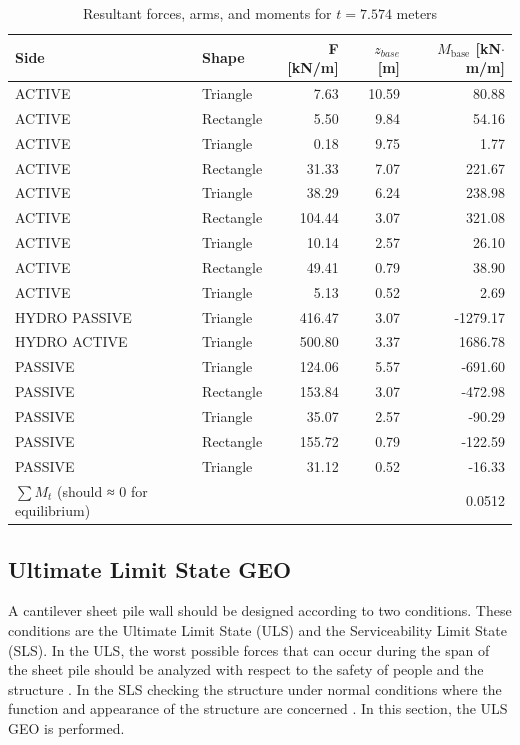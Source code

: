 \begin{table}[H]
  \centering
  \caption{Resultant forces, arms, and moments for $t = 7.574$ meters}
  \label{tab:forces_arms_moments_9713}
  \small
  \setlength{\tabcolsep}{8pt}
  \renewcommand{\arraystretch}{1.15}
  \begin{tabular}{@{}l l r r r@{}}
    \toprule
    Side & Shape &
    F [kN/m] & $z_{base}$ [m] &
    $M_{\text{base}}$ [kN$\cdot$m/m] \\
    \midrule
    ACTIVE  & Triangle  &   7.63  & 10.59 &  80.88 \\
    ACTIVE  & Rectangle &   5.50  &  9.84 &  54.16 \\
    ACTIVE  & Triangle  &   0.18  &  9.75 &   1.77 \\
    ACTIVE  & Rectangle &  31.33  &  7.07 & 221.67 \\
    ACTIVE  & Triangle  &  38.29  &  6.24 & 238.98 \\
    ACTIVE  & Rectangle & 104.44  &  3.07 & 321.08 \\
    ACTIVE  & Triangle  &  10.14  &  2.57 &  26.10 \\
    ACTIVE  & Rectangle &  49.41  &  0.79 &  38.90 \\
    ACTIVE  & Triangle  &   5.13  &  0.52 &   2.69 \\
    HYDRO PASSIVE   & Triangle  & 416.47  &  3.07 & -1279.17 \\
    HYDRO ACTIVE    & Triangle  & 500.80  &  3.37 & 1686.78 \\
    PASSIVE & Triangle  & 124.06  &  5.57 &  -691.60 \\
    PASSIVE & Rectangle & 153.84  &  3.07 &  -472.98 \\
    PASSIVE & Triangle  &  35.07  &  2.57 &   -90.29 \\
    PASSIVE & Rectangle & 155.72  &  0.79 &  -122.59 \\
    PASSIVE & Triangle  &  31.12  &  0.52 &   -16.33 \\
    \midrule
    $\sum M_{t}$ (should ≈ 0 for equilibrium) & & & & 0.0512 \\
    \bottomrule
  \end{tabular}
\end{table}

\subsection{Ultimate Limit State GEO}

A cantilever sheet pile wall should be designed according to two conditions. These conditions are the Ultimate Limit State (ULS) and the Serviceability Limit State (SLS). In the ULS, the worst possible forces that can occur during the span of the sheet pile should be analyzed with respect to the safety of people and the structure \autocite{baxterPilingHandbook2022}. In the SLS checking the structure under normal conditions where the function and appearance of the structure are concerned \autocite{baxterPilingHandbook2022}. In this section, the ULS GEO is performed.

